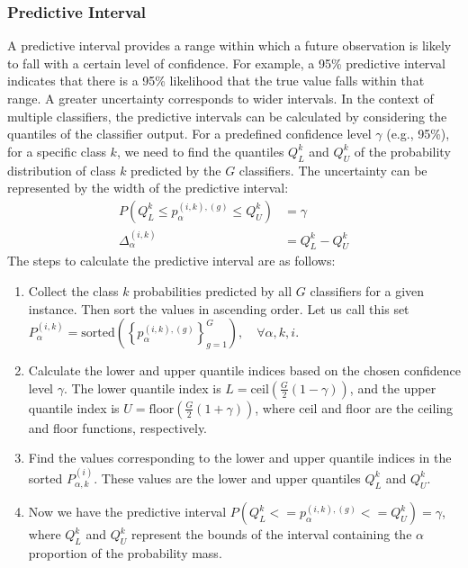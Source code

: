 \documentclass[sn-nature]{bst/sn-jnl}
\begin{document}
\subsubsection{Predictive Interval}
A predictive interval provides a range within which a future observation is likely to fall with a certain level of confidence. For example, a 95\% predictive interval indicates that there is a 95\% likelihood that the true value falls within that range. A greater uncertainty corresponds to wider intervals. In the context of multiple classifiers, the predictive intervals can be calculated by considering the quantiles of the classifier output. For a predefined confidence level $\gamma $ (e.g., 95\%), for a specific class $k $, we need to find the quantiles $Q_{L}^{k} $ and $Q_{U}^{k} $ of the probability distribution of class $k $ predicted by the $G $ classifiers. The uncertainty can be represented by the width of the predictive interval:
\begin{align}
    P\left(Q_L^{k} \leq p_{\alpha}^{(i,k),(g)} \leq Q_U^{k}\right) & = \gamma
    \\
    \Delta_{\alpha}^{(i,k)} & = Q_L^{k} - Q_U^{k}
    \label{eq:crowd.Eq.uncertainty}
\end{align}
The steps to calculate the predictive interval are as follows:
\begin{enumerate}
    \item Collect the class $k $ probabilities predicted by all $G$ classifiers for a given instance. Then sort the values in ascending order. Let us call this set $P_{\alpha}^{(i,k)}=\mathrm{sorted}\left({\left\{p_{\alpha}^{(i,k),(g)}\right\}}_{g=1}^G\right),\quad\forall \alpha,k,i $.
    \item Calculate the lower and upper quantile indices based on the chosen confidence level $\gamma $. The lower quantile index is $L=\mathrm{ceil}\left(\frac{G}{2}\left(1-\gamma\right)\right) $, and the upper quantile index is $U=\mathrm{floor}\left(\frac{G}{2} (1+\gamma)\right) $, where ceil and floor are the ceiling and floor functions, respectively.
    \item Find the values corresponding to the lower and upper quantile indices in the sorted $P_{\alpha,k}^{(i)} $. These values are the lower and upper quantiles $Q_L^{k} $ and $Q_U^{k} $.
    \item Now we have the predictive interval $P\left(Q_L^{k}<=p_{\alpha}^{(i,k),(g)}<=Q_U^{k}\right)=\gamma $, where $Q_L^{k} $ and $Q_U^{k} $ represent the bounds of the interval containing the $\alpha$ proportion of the probability mass.
\end{enumerate}
\end{document}
